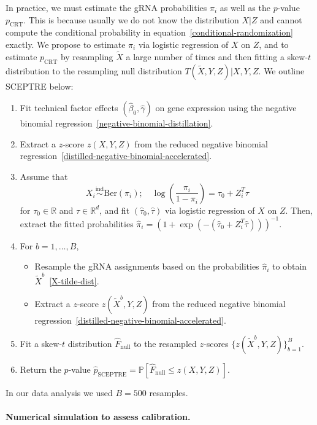 \documentclass{article}
\begin{document}
In practice, we must estimate the gRNA probabilities $\pi_i$ as well as the $p$-value $p_{\text{CRT}}$. This is because usually we do not know the distribution $X|Z$ and cannot compute the conditional probability in equation~\eqref{conditional-randomization} exactly. We propose to estimate $\pi_i$ via logistic regression of $X$ on $Z$, and to estimate $p_{\text{CRT}}$ by resampling $\widetilde X$ a large number of times and then fitting a skew-$t$ distribution to the resampling null distribution $T(\widetilde X, Y, Z)|X,Y,Z$. We outline SCEPTRE below: 
\begin{enumerate}
	\item Fit technical factor effects $(\widehat \beta_0,\widehat \gamma)$ on gene expression using the negative binomial regression~\eqref{negative-binomial-distillation}.
	\item Extract a $z$-score $z(X,Y,Z)$ from the reduced negative binomial regression~\eqref{distilled-negative-binomial-accelerated}.
	\item Assume that 
	\begin{equation}
	X_i \overset{\text{ind}}\sim \text{Ber}(\pi_i); \quad \log\left(\frac{\pi_i}{1-\pi_i}\right) = \tau_0 + Z_i^T \tau
	\label{logistic-regression}
	\end{equation}
	for $\tau_0 \in \mathbb R$ and $\tau \in \mathbb R^d$, and fit $(\widehat \tau_0, \widehat \tau)$ via logistic regression of $X$ on $Z$. Then, extract the fitted probabilities $\widehat \pi_i = (1+\exp(-(\widehat \tau_0 + Z_i^T \widehat \tau)))^{-1}$.	
	\item For $b = 1, \dots, B$,
	\begin{itemize}
		\item Resample the gRNA assignments based on the probabilities $\widehat \pi_i$ to obtain $\widetilde X^b$~\eqref{X-tilde-dist}.
		\item Extract a $z$-score $z(\widetilde X^b, Y, Z)$ from the reduced negative binomial regression~\eqref{distilled-negative-binomial-accelerated}.
	\end{itemize}
	\item Fit a skew-$t$ distribution $\widehat F_{\text{null}}$ to the resampled $z$-scores $\{z(\widetilde X^b, Y, Z)\}_{b = 1}^B$. 
	\item Return the $p$-value $\widehat p_{\text{SCEPTRE}} = \mathbb P[\widehat F_{\text{null}} \leq z(X,Y,Z)]$.
\end{enumerate}
In our data analysis we used $B = 500$ resamples. 

\paragraph{Numerical simulation to assess calibration.}
\end{document}
